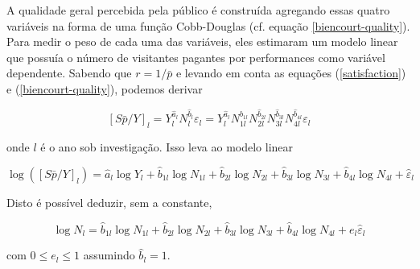\documentclass[a4paper, 12pt, openright, oneside, german, french, english, brazil]{abntex2}
\begin{document}
	
	A qualidade geral percebida pela público é construída agregando essas quatro variáveis na forma de uma função Cobb-Douglas (cf. equação \ref{biencourt-quality}). Para medir o peso de cada uma das variáveis, eles estimaram um modelo linear que possuía o número de visitantes pagantes por performances como variável dependente. Sabendo que $r = 1/\bar{p}$ e levando em conta as equações (\ref{satisfaction}) e (\ref{biencourt-quality}), podemos derivar
	
	\begin{equation}
	\label{biencourt-derivation}
	[S\bar{p}/Y]_l = Y_{l}^{\hat{a}_l} N_{l}^{\hat{b}_l} \varepsilon_l = Y_{l}^{\hat{a}_l} N_{1l}^{\hat{b}_{1l}} N_{2l}^{\hat{b}_{2l}} N_{3l}^{\hat{b}_{3l}} N_{4l}^{\hat{b}_{4l}} \varepsilon_l
	\end{equation}
	
	onde $l$ é o ano sob investigação. Isso leva ao modelo linear
	
	\begin{equation}
	\label{regression}
	\log([S\bar{p}/Y]_l) = \hat{a}_l \log Y_l + \hat{b}_{1l} \log N_{1l} + \hat{b}_{2l} \log N_{2l} + \hat{b}_{3l} \log N_{3l} + \hat{b}_{4l} \log N_{4l} + \hat{\varepsilon}_l
	\end{equation}
	
	Disto é possível deduzir, sem a constante,
	
	\begin{equation}
	\label{N-com-pesos}
	\log N_l = \hat{b}_{1l} \log N_{1l} + \hat{b}_{2l} \log N_{2l} + \hat{b}_{3l} \log N_{3l} + \hat{b}_{4l} \log N_{4l} + e_l \hat{\varepsilon}_l
	\end{equation}
	
	com $0 \le e_l \le 1$ assumindo $\hat{b}_l = 1$.
	
	
\end{document}
